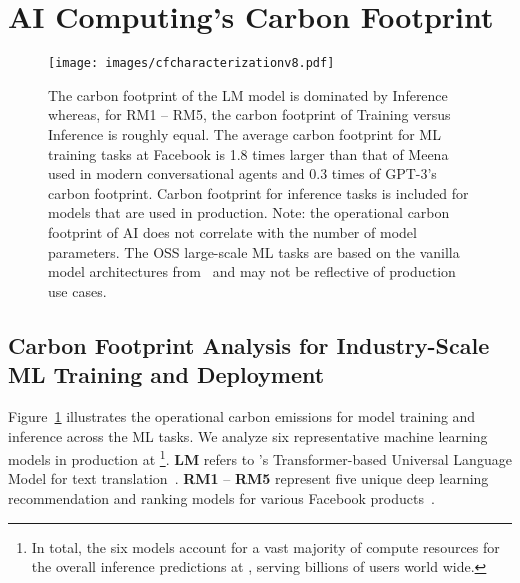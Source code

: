 \section{AI Computing's Carbon Footprint}
\label{sec:ai-carbon-footprint}


\begin{figure}[t]
    \centering
    \texttt{[image: images/cfcharacterizationv8.pdf]}
    \caption{The carbon footprint of the LM model is dominated by Inference whereas, for RM1 -- RM5, the carbon footprint of Training versus Inference is roughly equal. The average carbon footprint for ML training tasks at Facebook is 1.8 times larger than that of Meena used in modern conversational agents and 0.3 times of GPT-3's carbon footprint. Carbon footprint for inference tasks is included for models that are used in production. Note: the operational carbon footprint of AI does not correlate with the number of model parameters. The OSS large-scale ML tasks are based on the vanilla model architectures from~\cite{Patterson:arxiv:2021} and may not be reflective of production use cases.}
    \label{figure:cf-characterization}
\end{figure}



\subsection{Carbon Footprint Analysis for Industry-Scale ML Training and Deployment}




Figure~\ref{figure:cf-characterization} illustrates the operational carbon emissions for model training and inference across the ML tasks. 
We analyze six representative machine learning models in production at \fb\footnote{In total, the six models account for a vast majority of compute resources for the overall inference predictions at \fb, serving billions of users world wide.}.
\textbf{LM} refers to \fb's Transformer-based Universal Language Model for text translation~\cite{XLM-r}.
\textbf{RM1} -- \textbf{RM5} represent five unique deep learning recommendation and ranking models for various Facebook  products~\cite{Naumov:arxiv:2019,Gupta:hpca:2020}. 

